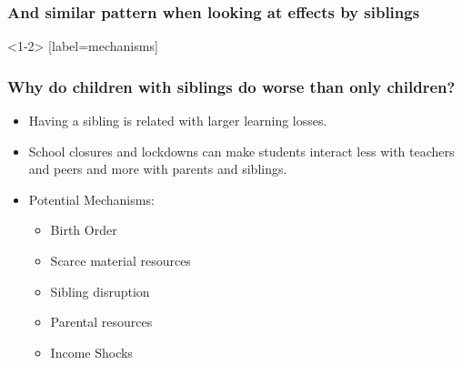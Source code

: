 \documentclass{beamer}
\begin{document}
\begin{frame}
    \label{frame:twfe_gpa_controls_siblings}
    \frametitle{And similar pattern when looking at effects by siblings}
        {
    }

    \begin{flushleft}
        \hyperlink{frame:twfe_gpa_controls}{}
    \end{flushleft}       

\end{frame}



\begin{frame}<1-2>
    [label=mechanisms]
    \frametitle{Why do children with siblings do worse than only children?}
\begin{itemize}
    \item Having a sibling is related with larger learning losses.
    \item School closures and lockdowns can make students interact less with teachers and peers and more with parents and siblings.
    \item Potential Mechanisms:   
    \begin{itemize}
        \item {}Birth Order
        \item {}Scarce material resources
        \item {}Sibling disruption
        \item {}Parental resources
        \item {}Income Shocks
    \end{itemize} 
\end{itemize}
\end{frame}
\end{document}
